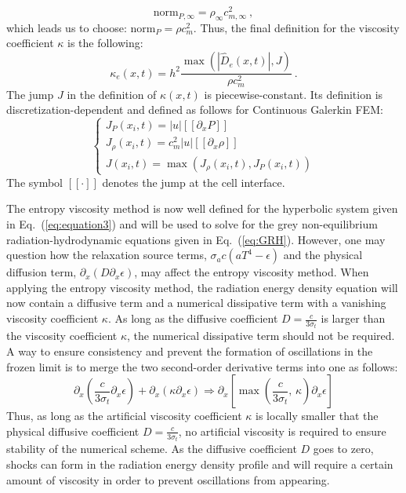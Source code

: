 \documentclass[review]{elsarticle}
\newcommand{\eqt}[1]{Eq.~(\ref{#1})}                     %
\newcommand{\norm}{\textrm{norm}}
\begin{document}
%
\begin{equation}
\norm_{P,\infty} = \rho_\infty c^2_{m,\infty} \nonumber \ ,
\end{equation}
%
which leads us to choose: $\norm_P = \rho c_m^2$. Thus, the final definition for the viscosity coefficient $\kappa$ is the following:
\begin{equation}
\label{eq:equation12bis}
\kappa_e(x,t) = h^2 \frac{\max (|\hat{D}_e(x,t)|, J)}{\rho c_m^2} \ .
\end{equation} 
The jump $J$ in the definition of $\kappa(x,t)$ is piecewise-constant. Its definition is discretization-dependent and defined as follows for Continuous Galerkin FEM: 
\begin{equation}
\label{eq:equation12ter}
\left\{
\begin{array}{lll}
J_P(x_i,t) = |u| [[\partial_x P]]\\
J_{\rho}(x_i,t) = c_m^2 |u|  [[\partial_x \rho]] \\
J(x_i,t) = \max( J_{\rho}(x_i,t), J_{P}(x_i,t) )
\end{array}
\right.
\end{equation}
The symbol $[[ \cdot ]]$ denotes the jump at the cell interface.

The entropy viscosity method is now well defined for the hyperbolic system given in \eqt{eq:equation3} and will be used to solve for the grey non-equilibrium radiation-hydrodynamic equations given in \eqt{eq:GRH}. However, one may question how the relaxation source terms, $\sigma_a c (a T^4-\epsilon)$ and the physical diffusion term, $\partial_x(D\partial_x \epsilon)$, may affect the entropy viscosity method. When applying the entropy viscosity method, the radiation energy density equation will now contain a diffusive term and a numerical dissipative term with a vanishing viscosity coefficient $\kappa$. As long as the diffusive coefficient $D=\frac{c}{3 \sigma_t}$ is larger than the viscosity coefficient $\kappa$, the numerical dissipative term should not be required. A way to ensure consistency and prevent the formation of oscillations in the frozen limit is to merge the two second-order derivative terms into one as follows:
\begin{equation}
 \partial_x \left( \frac{c}{3 \sigma_t} \partial_x \epsilon \right) + \partial_x \left( \kappa \partial_x \epsilon \right) 
 \Longrightarrow
 \partial_x \left[ \max\left(\frac{c}{3 \sigma_t} \text{, } \kappa \right) \partial_x \epsilon \right]
\end{equation}
Thus, as long as the artificial viscosity coefficient $\kappa$ is locally smaller that the physical diffusive coefficient $D=\frac{c}{3 \sigma_t}$, no artificial viscosity is required to ensure stability of the numerical scheme. As the diffusive coefficient $D$ goes to zero, shocks can form in the radiation energy density profile and will require a certain amount of viscosity in order to prevent oscillations from appearing.
\end{document}

